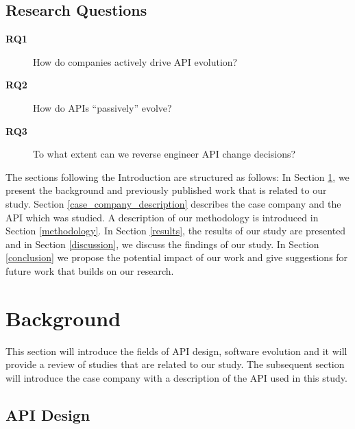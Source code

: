 \documentclass{sig-alternate}
\begin{document}
\subsection{Research Questions} \label{rqs}
\begin{description}
\item[\textbf{RQ1}] How do companies actively drive API evolution?
\item[\textbf{RQ2}] How do APIs ``passively'' evolve?
\item[\textbf{RQ3}] To what extent can we reverse engineer API change decisions?


\end{description}

The sections following the Introduction are structured as follows: In Section \ref{background}, we present the background and previously published work that is related to our study. Section \ref{case_company_description} describes the case company and the API which was studied. A description of our methodology is introduced in Section \ref{methodology}. In Section \ref{results}, the results of our study are presented and in Section \ref{discussion}, we discuss the findings of our study. In Section \ref{conclusion} we propose the potential impact of our work and give suggestions for future work that builds on our research. 

\section{Background} \label{background}
This section will introduce the fields of API design, software evolution and it will provide a review of studies that are related to our study. The subsequent section will introduce the case company with a description of the API used in this study.  

\subsection{API Design} \label{api_design}
\end{document}
